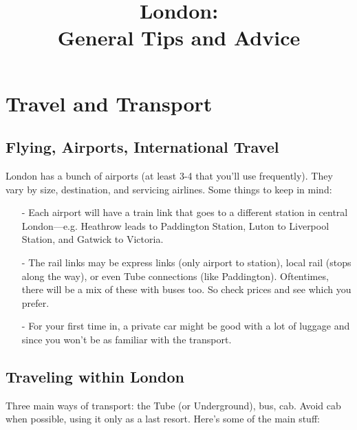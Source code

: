 \documentclass[a4paper,12pt]{scrartcl}
\author{}
\title{London:\\ General Tips and Advice}
\date{}
\begin{document}
\maketitle

\tableofcontents %

\newpage
\section{Travel and Transport}

\subsection{Flying, Airports, International Travel}

London has a bunch of airports (at least 3-4 that you'll 
use frequently). They vary by size, destination, and servicing
airlines. Some things to keep in mind:

\begin{itemize}
   \item[-] Each airport will have a train link that goes to a different 
      station in central London---e.g. Heathrow leads to Paddington
      Station, Luton to Liverpool Station, and Gatwick to Victoria.
   \item[-] 
      The rail links may be express links (only airport to station),
      local rail (stops along the way), or even Tube connections
      (like Paddington). Oftentimes, there will be a mix of these
      with buses too. So check prices and see which you prefer.
   \item[-] For your first time in, a private car might be good
      with a lot of luggage and since you won't be as familiar with
      the transport.
\end{itemize}

\subsection{Traveling within London}

Three main ways of transport: the Tube (or Underground), bus, cab. 
Avoid cab when possible, using it only as a last resort. Here's
some of the main stuff:
\end{document}
